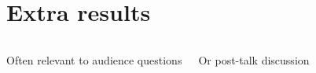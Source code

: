 \documentclass[smaller,aspectratio=149]{beamer}
\begin{document}

\section{Extra results}

\begin{frame}{}
	\bigskip\medskip
	\begin{columns}[T]
		Often relevant to audience questions \par
		\medskip Or post-talk discussion \par
		\begin{centering}%
			\par%
		\end{centering}	
	\end{columns}
\end{frame}


\begin{frame}{}
	\tableofcontents
\end{frame}
\end{document}
